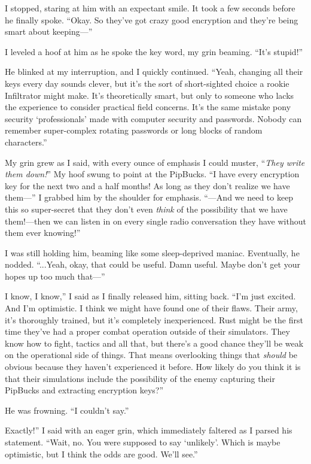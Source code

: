 I stopped, staring at him with an expectant smile. It took a few seconds before he finally spoke. “Okay. So they’ve got crazy good encryption and they’re being smart about keeping—”

I leveled a hoof at him as he spoke the key word, my grin beaming. “It’s stupid!”

He blinked at my interruption, and I quickly continued. “Yeah, changing all their keys every day sounds clever, but it’s the sort of short-sighted choice a rookie Infiltrator might make. It’s theoretically smart, but only to someone who lacks the experience to consider practical field concerns. It’s the same mistake pony security ‘professionals’ made with computer security and passwords. Nobody can remember super-complex rotating passwords or long blocks of random characters.”

My grin grew as I said, with every ounce of emphasis I could muster, “\textit{They write them down!}” My hoof swung to point at the PipBucks. “I have every encryption key for the next two and a half months! As long as they don’t realize we have them—” I grabbed him by the shoulder for emphasis. “—And we need to keep this so super-secret that they don’t even \textit{think} of the possibility that we have them!—then we can listen in on every single radio conversation they have without them ever knowing!”

I was still holding him, beaming like some sleep-deprived maniac. Eventually, he nodded. “...Yeah, okay, that could be useful. Damn useful. Maybe don’t get your hopes up too much that—”

\leavevmode{}I know, I know,” I said as I finally released him, sitting back. “I’m just excited. And I’m optimistic. I think we might have found one of their flaws. Their army, it’s thoroughly trained, but it’s completely inexperienced. Rust might be the first time they’ve had a proper combat operation outside of their simulators. They know how to fight, tactics and all that, but there’s a good chance they’ll be weak on the operational side of things. That means overlooking things that \textit{should} be obvious because they haven’t experienced it before. How likely do you think it is that their simulations include the possibility of the enemy capturing their PipBucks and extracting encryption keys?”

He was frowning. “I couldn’t say.”

\leavevmode{}Exactly!” I said with an eager grin, which immediately faltered as I parsed his statement. “Wait, no. You were supposed to say ‘unlikely’. Which is maybe optimistic, but I think the odds are good. We’ll see.”

